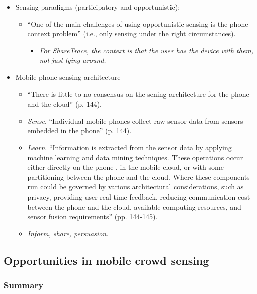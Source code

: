 \begin{itemize}
\begin{itemize}
	\end{itemize}
\item Sensing paradigms (participatory and opportunistic):
	\begin{itemize}
	\item ``One of the main challenges of using opportunistic sensing is the phone context problem'' (i.e., only sensing under the right circumstances).
		\begin{itemize}
		\item \emph{For ShareTrace, the context is that the user has the device with them, not just lying around.}
		\end{itemize}
	\end{itemize}
\item Mobile phone sensing architecture
	\begin{itemize}
	\item ``There is little to no consensus on the sening architecture for the phone and the cloud'' (p. 144).
	\item \emph{Sense}. ``Individual mobile phones collect raw sensor data from sensors embedded in the phone'' (p. 144).
	\item \emph{Learn}. ``Information is extracted from the sensor data by applying machine learning and data mining techniques. These operations occur either directly on the phone , in the mobile cloud, or with some partitioning between the phone and the cloud. Where these components run could be governed by various architectural considerations, such as privacy, providing user real-time feedback, reducing communication cost between the phone and the cloud, available computing resources, and sensor fusion requirements'' (pp. 144-145).
	\item \emph{Inform, share, persuasion}.
	\end{itemize}
\end{itemize}
\subsection{Opportunities in mobile crowd sensing}
\subsubsection*{Summary}
